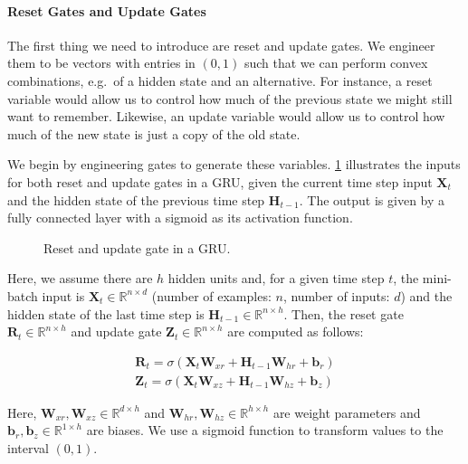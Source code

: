 \paragraph{Reset Gates and Update Gates}

The first thing we need to introduce are reset and update gates. We engineer them to be vectors with entries in $(0,1)$ such that we can perform convex combinations, e.g.\ of a hidden state and an alternative. For instance, a reset variable would allow us to control how much of the previous state we might still want to remember. Likewise, an update variable would allow us to control how much of the new state is just a copy of the old state.

We begin by engineering gates to generate these variables. \cref{fig:gru_1} illustrates the inputs for both reset and update gates in a GRU, given the current time step input $\mathbf{X}_t$ and the hidden state of the previous time step $\mathbf{H}_{t-1}$. The output is given by a fully connected layer with a sigmoid as its activation function.

\begin{figure}[hpt]
	\centering
	
	\caption{Reset and update gate in a GRU.}
	\label{fig:gru_1}
\end{figure}

Here, we assume there are $h$ hidden units and, for a given time step $t$, the mini-batch input is $\mathbf{X}_t \in \mathbb{R}^{n \times d}$ (number of examples: $n$, number of inputs: $d$) and the hidden state of the last time step is $\mathbf{H}_{t-1} \in \mathbb{R}^{n \times h}$. Then, the reset gate $\mathbf{R}_t \in \mathbb{R}^{n \times h}$ and update gate $\mathbf{Z}_t \in \mathbb{R}^{n \times h}$ are computed as follows:

$$
\begin{aligned}
\mathbf{R}_t = \sigma(\mathbf{X}_t \mathbf{W}_{xr} + \mathbf{H}_{t-1} \mathbf{W}_{hr} + \mathbf{b}_r)\\
\mathbf{Z}_t = \sigma(\mathbf{X}_t \mathbf{W}_{xz} + \mathbf{H}_{t-1} \mathbf{W}_{hz} + \mathbf{b}_z)
\end{aligned}
$$

Here, $\mathbf{W}_{xr}, \mathbf{W}_{xz} \in \mathbb{R}^{d \times h}$ and $\mathbf{W}_{hr}, \mathbf{W}_{hz} \in \mathbb{R}^{h \times h}$ are weight parameters and $\mathbf{b}_r, \mathbf{b}_z \in \mathbb{R}^{1 \times h}$ are biases. We use a sigmoid function to transform values to the interval $(0,1)$.

